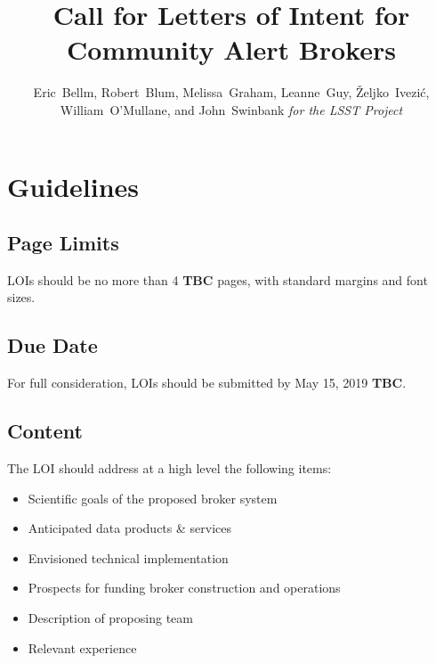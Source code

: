 \documentclass[DM,toc,lsstdraft]{lsstdoc}
\title{Call for Letters of Intent for Community Alert Brokers}
\author{
Eric~Bellm,
Robert~Blum,
Melissa~Graham,
Leanne~Guy,
\v{Z}eljko~Ivezi\'{c},
William~O'Mullane,
and John~Swinbank
\emph{for the LSST Project}
}
\begin{document}

\maketitle


\section{Guidelines}

\subsection{Page Limits}

LOIs should be no more than 4 \textbf{TBC} pages, with standard margins and font sizes.

\subsection{Due Date}

For full consideration, LOIs should be submitted by May 15, 2019 \textbf{TBC}.

\subsection{Content}

The LOI should address at a high level the following items:

\begin{itemize}
	\item Scientific goals of the proposed broker system
	\item Anticipated data products \& services
	\item Envisioned technical implementation
	\item Prospects for funding broker construction and operations
	\item Description of proposing team
	\item Relevant experience 
\end{itemize}
\end{document}
